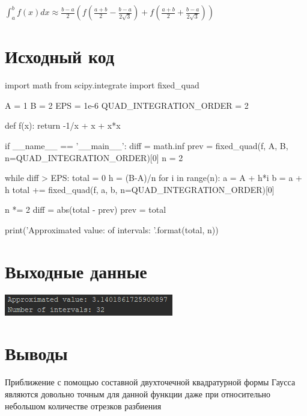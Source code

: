 \documentclass{article}
\begin{document}
$\int_{a}^{b}f(x)dx \approx \frac{b-a}{2}(f(\frac{a+b}{2} - \frac{b-a}{2 \sqrt{3}}) + f(\frac{a+b}{2} + \frac{b-a}{2 \sqrt{3}}))$

\section{Исходный код}

\begin{python}
import math
from scipy.integrate import fixed_quad

A = 1
B = 2
EPS = 1e-6
QUAD_INTEGRATION_ORDER = 2


def f(x):
	return -1/x + x + x*x


if __name__ == '__main__':
	diff = math.inf
	prev = fixed_quad(f, A, B, n=QUAD_INTEGRATION_ORDER)[0]
	n = 2

	while diff > EPS:
		total = 0
		h = (B-A)/n
		for i in range(n):
			a = A + h*i
			b = a + h
			total += fixed_quad(f, a, b, n=QUAD_INTEGRATION_ORDER)[0]

		n *= 2
		diff = abs(total - prev)
		prev = total

	print('Approximated value: {}\nNumber of intervals: {}'.format(total, n))

\end{python}

\section{Выходные данные}

\includegraphics[width=0.7\linewidth]{screenshot001}

\section{Выводы}

Приближение с помощью составной двухточечной квадратурной формы Гаусса являются довольно точным для данной функции даже при относительно небольшом 
количестве отрезков разбиения
\end{document}
